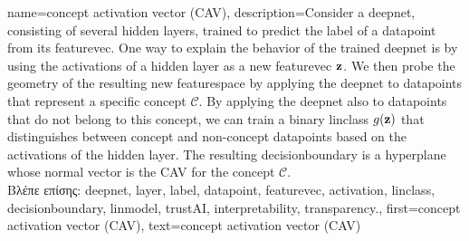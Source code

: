 {name={concept activation vector (CAV)},
	description={Consider a \gls{deepnet}, consisting  of several hidden \gls{layer}s, 
		trained to predict the \gls{label} of a \gls{datapoint} from its \gls{featurevec}. One way 
		to explain the behavior of the trained \gls{deepnet} is by using the \gls{activation}s of a 
		hidden \gls{layer} as a new \gls{featurevec} ${\bf z}$. We then probe the geometry of the 
		resulting new \gls{featurespace} by applying the \gls{deepnet} to \gls{datapoint}s 
		that represent a specific concept $\mathcal{C}$. By applying the \gls{deepnet} also to \gls{datapoint}s 
		that do not belong to this concept, we can train a binary \gls{linclass} $g({\bf z})$ that distinguishes 
		between concept and non-concept \gls{datapoint}s based on the \gls{activation}s of the hidden \gls{layer}. The resulting 
		\gls{decisionboundary} is a hyperplane whose normal \gls{vector} is the CAV for the concept $\mathcal{C}$. \\
		\foreignlanguage{greek}{Βλέπε επίσης:} \gls{deepnet}, \gls{layer}, \gls{label}, \gls{datapoint}, \gls{featurevec}, \gls{activation}, 
		\gls{linclass}, \gls{decisionboundary}, \gls{linmodel}, \gls{trustAI}, \gls{interpretability}, \gls{transparency}.}, 
	first={concept activation vector (CAV)},
	text={concept activation vector (CAV)}
}

